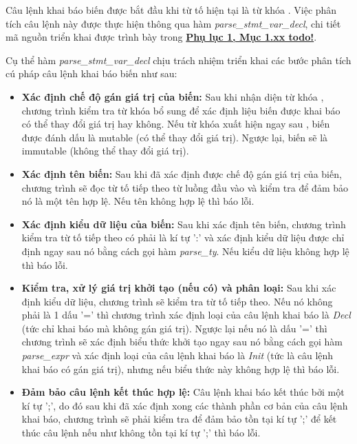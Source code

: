 Câu lệnh khai báo biến được bắt đầu khi từ tố hiện tại là từ khóa . Việc phân tích câu lệnh này được thực hiện thông qua hàm \textit{parse\_stmt\_var\_decl}, chi tiết mã nguồn triển khai được trình bày trong \hyperref[ap1:simple_token]{\bf Phụ lục 1, Mục 1.xx todo!}.

Cụ thể hàm \textit{parse\_stmt\_var\_decl} chịu trách nhiệm triển khai các bước phân tích cú pháp câu lệnh khai báo biến như sau:

\begin{itemize}
    \item \textbf{Xác định chế độ gán giá trị của biến:}
    Sau khi nhận diện từ khóa , chương trình kiểm tra từ khóa bổ sung để xác định liệu biến được khai báo có thể thay đổi giá trị hay không. Nếu từ khóa  xuất hiện ngay sau , biến được đánh dấu là mutable (có thể thay đổi giá trị). Ngược lại, biến sẽ là immutable (không thể thay đổi giá trị).
    \item \textbf{Xác định tên biến:}
    Sau khi đã xác định được chế độ gán giá trị của biến, chương trình sẽ đọc từ tố tiếp theo từ luồng đầu vào và kiểm tra để đảm bảo nó là một tên hợp lệ. Nếu tên không hợp lệ thì báo lỗi. %
    \item \textbf{Xác định kiểu dữ liệu của biến:}
    Sau khi xác định tên biến, chương trình kiểm tra từ tố tiếp theo có phải là kí tự ':' và xác định kiểu dữ liệu được chỉ định ngay sau nó bằng cách gọi hàm \textit{parse\_ty}. Nếu kiểu dữ liệu không hợp lệ thì báo lỗi. %
    \item \textbf{Kiểm tra, xử lý giá trị khởi tạo (nếu có) và phân loại:}
    Sau khi xác định kiểu dữ liệu, chương trình sẽ kiểm tra từ tố tiếp theo. Nếu nó không phải là 1 dấu '=' thì chương trình xác định loại của câu lệnh khai báo là \textit{Decl} (tức chỉ khai báo mà không gán giá trị). Ngược lại nếu nó là dấu '=' thì chương trình sẽ xác định biểu thức khởi tạo ngay sau nó bằng cách gọi hàm \textit{parse\_expr} và xác định loại của câu lệnh khai báo là \textit{Init} (tức là câu lệnh khai báo có gán giá trị), nhưng nếu biểu thức này không hợp lệ thì báo lỗi. %
    \item \textbf{Đảm bảo câu lệnh kết thúc hợp lệ:}
    Câu lệnh khai báo kết thúc bởi một kí tự ';', do đó sau khi đã xác định xong các thành phần cơ bản của câu lệnh khai báo, chương trình sẽ phải kiểm tra để đảm bảo tồn tại kí tự ';' để kết thúc câu lệnh nếu như không tồn tại kí tự ';' thì báo lỗi. %
\end{itemize}


